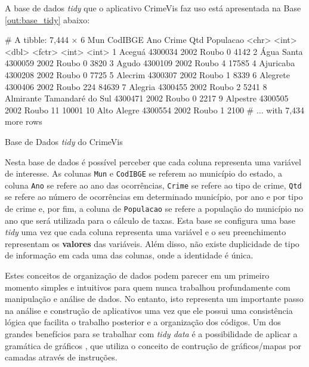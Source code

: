 \documentclass[12pt,openright,oneside,a4paper,english,french,spanish]{abntex2}
\numberwithin{table}{section} %
\numberwithin{figure}{section} %
\begin{document}
A base de dados \textit{tidy} que o aplicativo CrimeVis faz uso está apresentada na Base \ref{out:base_tidy} abaixo:
\begin{routput}
\begin{Schunk}
\begin{Soutput}
# A tibble: 7,444 × 6
                          Mun CodIBGE   Ano  Crime   Qtd Populacao
                        <chr>   <int> <dbl> <fctr> <int>     <int>
1                      Aceguá 4300034  2002  Roubo     0      4142
2                  Água Santa 4300059  2002  Roubo     0      3820
3                       Agudo 4300109  2002  Roubo     4     17585
4                   Ajuricaba 4300208  2002  Roubo     0      7725
5                     Alecrim 4300307  2002  Roubo     1      8339
6                    Alegrete 4300406  2002  Roubo   224     84639
7                     Alegria 4300455  2002  Roubo     2      5241
8  Almirante Tamandaré do Sul 4300471  2002  Roubo     0      2217
9                    Alpestre 4300505  2002  Roubo    11     10001
10                Alto Alegre 4300554  2002  Roubo     1      2100
# ... with 7,434 more rows
\end{Soutput}
\end{Schunk}
\caption{Base de Dados \textit{tidy} do CrimeVis}
\label{out:base_tidy}
\end{routput}

Nesta base de dados é possível perceber que cada coluna representa uma variável de interesse. As colunas \texttt{Mun} e \texttt{CodIBGE} se referem ao município do estado, a coluna \texttt{Ano} se refere ao ano das ocorrências, \texttt{Crime} se refere ao tipo de crime, \texttt{Qtd} se refere ao número de ocorrências em determinado município, por ano e por tipo de crime e, por fim, a coluna de \texttt{Populacao} se refere a população do município no ano que será utilizada para o cálculo de taxas. Esta base se configura uma base \textit{tidy} uma vez que cada coluna representa uma variável e o seu preenchimento representam os \textbf{valores} das variáveis. Além disso, não existe duplicidade de tipo de informação em cada uma das colunas, onde a identidade é única.

Estes conceitos de organização de dados podem parecer em um primeiro momento simples e intuitivos para quem nunca trabalhou profundamente com manipulação e análise de dados. No entanto, isto representa um importante passo na análise e construção de aplicativos uma vez que ele possui uma consistência lógica que facilita o trabalho posterior e a organização dos códigos. Um dos grandes benefícios para se trabalhar com \textit{tidy data} é a possibilidade de aplicar a gramática de gráficos \cite{wilkinson2006grammar}, que utiliza o conceito de contrução de gráficos/mapas por camadas através de instruções.
\end{document}
